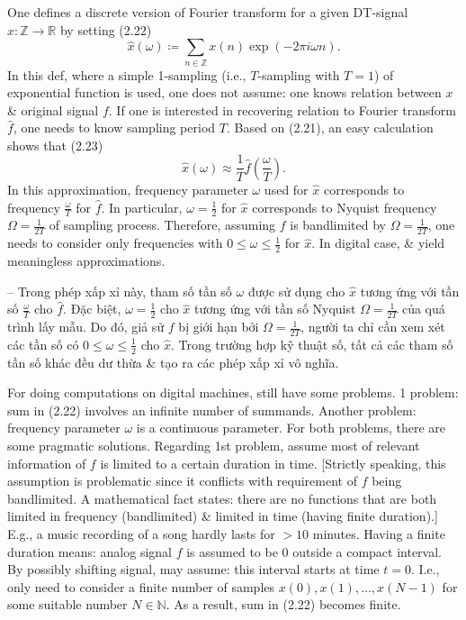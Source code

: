 \documentclass{article}
\begin{document}
\begin{itemize}
\begin{itemize}
\begin{itemize}
			One defines a discrete version of Fourier transform for a given DT-signal $x:\mathbb{Z}\to\mathbb{R}$ by setting (2.22)
			\begin{equation*}
				\hat{x}(\omega)\coloneqq\sum_{n\in\mathbb{Z}} x(n)\exp(-2\pi i\omega n).
			\end{equation*}
			In this def, where a simple 1-sampling (i.e., $T$-sampling with $T = 1$) of exponential function is used, one does not assume: one knows relation between $x$ \& original signal $f$. If one is interested in recovering relation to Fourier transform $\hat{f}$, one needs to know sampling period $T$. Based on (2.21), an easy calculation shows that (2.23)
			\begin{equation*}
				\hat{x}(\omega)\approx\frac{1}{T}\hat{f}\left(\frac{\omega}{T}\right).
			\end{equation*}
			In this approximation, frequency parameter $\omega$ used for $\hat{x}$ corresponds to frequency $\frac{\omega}{T}$ for $\hat{f}$. In particular, $\omega = \frac{1}{2}$ for $\hat{x}$ corresponds to Nyquist frequency $\Omega = \frac{1}{2T}$ of sampling process. Therefore, assuming $f$ is bandlimited by $\Omega = \frac{1}{2T}$, one needs to consider only frequencies with $0\le\omega\le\frac{1}{2}$ for $\hat{x}$. In digital case,  \& yield meaningless approximations.
			
			-- Trong phép xấp xỉ này, tham số tần số $\omega$ được sử dụng cho $\hat{x}$ tương ứng với tần số $\frac{\omega}{T}$ cho $\hat{f}$. Đặc biệt, $\omega = \frac{1}{2}$ cho $\hat{x}$ tương ứng với tần số Nyquist $\Omega = \frac{1}{2T}$ của quá trình lấy mẫu. Do đó, giả sử $f$ bị giới hạn bởi $\Omega = \frac{1}{2T}$, người ta chỉ cần xem xét các tần số có $0\le\omega\le\frac{1}{2}$ cho $\hat{x}$. Trong trường hợp kỹ thuật số, tất cả các tham số tần số khác đều dư thừa \& tạo ra các phép xấp xỉ vô nghĩa.
			
			For doing computations on digital machines, still have some problems. 1 problem: sum in (2.22) involves an infinite number of summands. Another problem: frequency parameter $\omega$ is a continuous parameter. For both problems, there are some pragmatic solutions. Regarding 1st problem, assume most of relevant information of $f$ is limited to a certain duration in time. [Strictly speaking, this assumption is problematic since it conflicts with requirement of $f$ being bandlimited. A mathematical fact states: there are no functions that are both limited in frequency (bandlimited) \& limited in time (having finite duration).] E.g., a music recording of a song hardly lasts for $> 10$ minutes. Having a finite duration means: analog signal $f$ is assumed to be 0 outside a compact interval. By possibly shifting signal, may assume: this interval starts at time $t = 0$. I.e., only need to consider a finite number of samples $x(0),x(1),\ldots,x(N-1)$ for some suitable number $N\in\mathbb{N}$. As a result, sum in (2.22) becomes finite.
			

\end{itemize}
\end{itemize}
\end{itemize}
\end{document}
